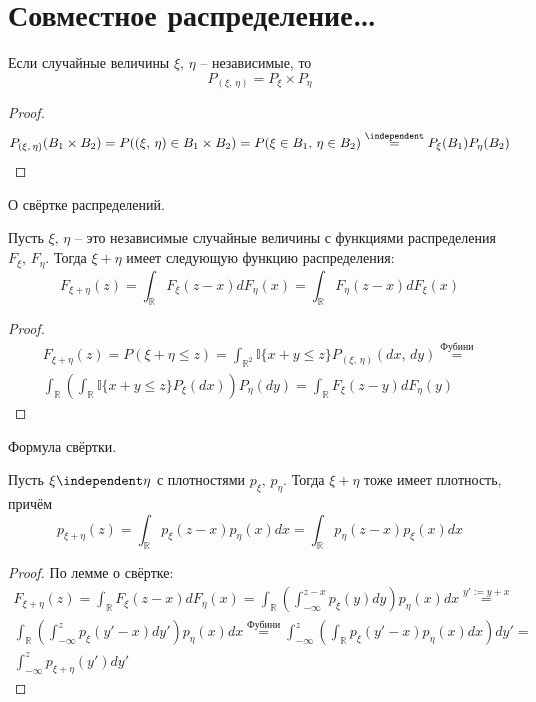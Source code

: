 \section{Совместное распределение\dots}
\begin{proposition}
	Если случайные величины $\xi,\,\eta$ -- независимые, то
	\[P_{(\xi,\,\eta)} = P_\xi \times P_\eta\]
\end{proposition}

\begin{proof}
	\[
		P_{(\xi,\,\eta)}(B_1 \times B_2) = P((\xi,\,\eta) \in B_1 \times B_2) = P(\xi \in B_1,\, \eta \in B_2) \stackrel{\independent}{=} P_\xi(B_1)P_\eta(B_2)
	\]
\end{proof}

\begin{lemma}
	О свёртке распределений.

	Пусть $\xi,\, \eta$ -- это независимые случайные величины с функциями распределения $F_\xi,\, F_\eta$. Тогда $\xi + \eta$ имеет следующую функцию распределения:
	\[F_{\xi + \eta}(z) = \int_\mathbb{R}F_\xi(z - x)dF_\eta(x) = \int_\mathbb{R}F_\eta(z - x)dF_\xi(x)\]
\end{lemma}

\begin{proof}
	\begin{align*}
		F_{\xi + \eta}(z) = P(\xi + \eta \leq z) = \int_{\mathbb{R}^2}\mathbb{I}\{x + y \leq z\}P_{(\xi,\,\eta)}(dx,\, dy) \stackrel{\text{Фубини}}{=} \\
		\int_\mathbb{R}\left(\int_\mathbb{R}\mathbb{I}\{x + y \leq z\}P_\xi(dx)\right)P_\eta(dy) = \int_\mathbb{R} F_\xi(z - y)dF_\eta(y)
	\end{align*}
\end{proof}

\begin{corollary}
	Формула свёртки.

	Пусть $\xi \independent \eta$ с плотностями $p_\xi,\, p_\eta$. Тогда $\xi + \eta$ тоже имеет плотность, причём
	\[p_{\xi + \eta}(z) = \int_\mathbb{R}p_\xi(z - x)p_\eta(x)dx = \int_\mathbb{R} p_\eta(z - x)p_\xi(x)dx\]
\end{corollary}

\begin{proof}
	По лемме о свёртке:
	\begin{align*}
		F_{\xi + \eta}(z) = \int_\mathbb{R}F_\xi(z - x)dF_\eta(x) = \int_\mathbb{R}\left(\int_{-\infty}^{z - x}p_\xi(y)dy\right)p_\eta(x)dx \stackrel{y' := y + x}{=}                   \\
		\int_\mathbb{R} \left(\int_{-\infty}^z p_\xi(y' - x)dy'\right)p_\eta(x)dx \stackrel{\text{Фубини}}{=} \int_{-\infty}^z \left(\int_\mathbb{R}p_\xi(y' - x)p_\eta(x)dx\right)dy' = \\
		\int_{-\infty}^z p_{\xi + \eta}(y')dy'
	\end{align*}
\end{proof}
